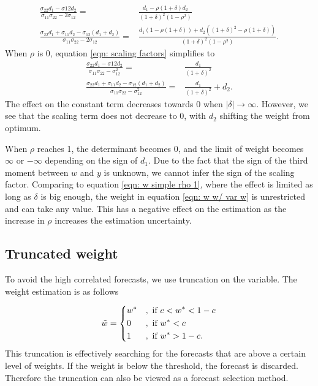 \documentclass[11pt]{article}
\begin{document}
\begin{equation}
\label{eqn: scaling factors}
\begin{aligned}
\frac{\sigma_{22} d_1 - \sigma{12}d_2}{\sigma_{11}\sigma_{22} - 2\sigma_{12}} =& \frac{d_1-\rho(1+\delta) d_2}{(1+\delta)^2 (1- \rho^2)}\\
\frac{\sigma_{22} d_1 + \sigma_{11} d_2 -\sigma_{12} (d_1 + d_2)}{\sigma_{11}\sigma_{22} - 2\sigma_{12}} =& \frac{d_1(1- \rho(1+\delta)) + d_2 ((1+\delta)^2-\rho(1+\delta))} {(1+\delta)^2 (1- \rho^2)}.
\end{aligned}
\end{equation}
When $\rho$ is 0, equation \ref{eqn: scaling factors} simplifies to 
\begin{equation}
\label{eqn: scaling factor rho 0}
\begin{aligned}
\frac{\sigma_{22} d_1 - \sigma{12}d_2}{\sigma_{11}\sigma_{22} - \sigma_{12}^2} =& \frac{d_1}{(1+\delta)^2}\\
\frac{\sigma_{22} d_1 + \sigma_{11} d_2 -\sigma_{12} (d_1 + d_2)}{\sigma_{11}\sigma_{22} - \sigma_{12}^2} =& \frac{d_1} {(1+\delta)^2} + d_2.
\end{aligned}
\end{equation}
The effect on the constant term decreases towards 0 when $|\delta| \to \infty$. However, we see that the scaling term does not decrease to 0, with $d_2$ shifting the weight from optimum.


When $\rho$ reaches 1, the determinant becomes 0, and the limit of weight becomes $\infty$ or $-\infty$ depending on the sign of $d_1$. Due to the fact that the sign of the third moment between $w$ and $y$ is unknown, we cannot infer the sign of the scaling factor. Comparing to equation \ref{eqn: w simple rho 1}, where the effect is limited as long as $\delta$ is big enough, the weight in equation \ref{eqn: w w/ var w} is unrestricted and can take any value. This has a negative effect on the estimation as the increase in $\rho$ increases the estimation uncertainty.

\subsection{Truncated weight}\label{truncated-weight}

To avoid the high correlated forecasts, we use truncation on the
variable. The weight estimation is as follows

\begin{equation}
\label{eqn: w trunc}
\tilde{w} = 
\begin{dcases}
w^* &, \text{ if } c<w^*<1-c \\
0 &, \text{ if } w^*<c \\
1 &, \text{ if } w^*>1-c.
\end{dcases}
\end{equation}
This truncation is effectively searching for the forecasts that are above a certain level of weights. If the weight is below the threshold, the forecast is discarded. Therefore the truncation can also be viewed as a forecast selection method.
\end{document}

